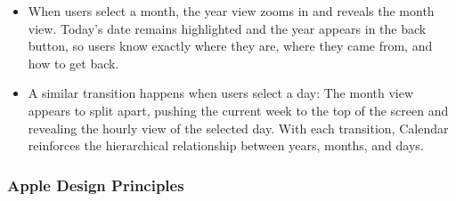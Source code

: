 \begin{itemize}
\begin{itemize}
\begin{itemize}
		\item When users select a month, the year view zooms in and reveals the month view. Today’s date remains highlighted and the year appears in the back button, so users know exactly where they are, where they came from, and how to get back.
		\item A similar transition happens when users select a day: The month view appears to split apart, pushing the current week to the top of the screen and revealing the hourly view of the selected day. With each transition, Calendar reinforces the hierarchical relationship between years, months, and days.
		\end{itemize}
	\end{itemize}
\end{itemize}

\subsubsection*{Apple Design Principles}
